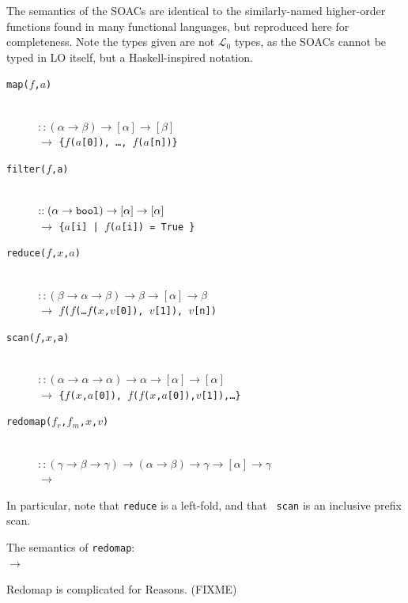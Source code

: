 \documentclass{sigplanconf}  %
\newcommand{\LO}{$\mathcal{L}_0$}
\begin{document}
The semantics of the SOACs are identical to the similarly-named
higher-order functions found in many functional languages, but
reproduced here for completeness.  Note the types given are not \LO{}
types, as the SOACs cannot be typed in LO{} itself, but a
Haskell-inspired notation.
\begin{description}
\item[\tt map($f$,$a$)]\hfill\\
  $:: (\alpha\rightarrow\beta)\rightarrow[\alpha]\rightarrow[\beta]$\\
  $\rightarrow$ {\tt\{$f$($a$[0]), \ldots, $f$($a$[n])\}}

\item[{\tt filter($f$,a)}]\hfill\\
  $:: (\alpha\rightarrow{\tt bool})\rightarrow[\alpha]\rightarrow[\alpha]$\\
  $\rightarrow$ {\tt\{$a$[i] | $f$($a$[i]) = {\tt True }\}}

\item[{\tt reduce($f$,$x$,$a$)}]\hfill\\
  $:: (\beta\rightarrow\alpha\rightarrow\beta)\rightarrow\beta\rightarrow[\alpha]\rightarrow\beta$\\
  $\rightarrow$ {\tt $f$($f$(\ldots $f$($x$,$v$[0]), $v$[1]), $v$[n])}

\item[{\tt scan($f$,$x$,a)}]\hfill\\
  $:: (\alpha\rightarrow\alpha\rightarrow\alpha)\rightarrow\alpha\rightarrow[\alpha]\rightarrow[\alpha]$\\
  $\rightarrow$ {\tt\{$f$($x$,$a$[0]), $f$($f$($x$,$a$[0]),$v$[1]),\ldots\}}

\item[{\tt redomap($f_{r}$,$f_{m}$,$x$,$v$)}]\hfill\\
  $:: (\gamma\rightarrow\beta\rightarrow\gamma)\rightarrow(\alpha\rightarrow\beta)\rightarrow\gamma\rightarrow[\alpha]\rightarrow\gamma$\\
  $\rightarrow$  \\
\end{description}
In particular, note that {\tt reduce} is a left-fold, and that {\tt
  scan} is an inclusive prefix scan.

The semantics of {\tt redomap}:\\
             $\rightarrow$

Redomap is complicated for Reasons. (FIXME)
\end{document}
